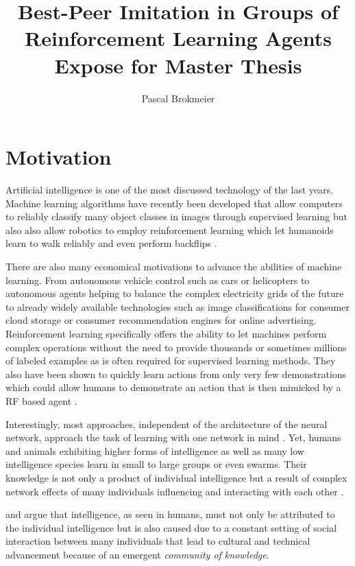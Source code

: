 \documentclass[12pt,a4paper]{article}
\title{Best-Peer Imitation in Groups of Reinforcement Learning Agents \\
\small{Expose for Master Thesis}}
\author{Pascal Brokmeier}
\begin{document}
\maketitle

\section{Motivation}

Artificial intelligence is one of the most discussed technology of the last years. Machine learning algorithms have recently been developed that allow computers to reliably classify many object classes in images \cite{krizhevsky2012imagenet} through supervised learning but also also allow robotics to employ reinforcement learning which let humanoids learn to walk reliably and even perform backflips \cite{proximalpolicyopt}.

There are also many economical motivations to advance the abilities of machine learning. From autonomous vehicle control such as cars or helicopters \cite{abbeel2010autonomous} to autonomous agents helping to balance the complex electricity grids of the future \cite{peters2013reinforcement} to already widely available technologies such as image classifications for consumer cloud storage or consumer recommendation engines for online advertising. Reinforcement learning specifically offers the ability to let machines perform complex operations without the need to provide thousands or sometimes millions of labeled examples as is often required for supervised learning methods. They also have been shown to quickly learn actions from only very few demonstrations which could allow humans to demonstrate an action that is then mimicked by a RF based agent \cite{duan2017one}.


Interestingly, most approaches, independent of the architecture of the neural network, approach the task of learning with one network in mind \cite[p.694ff]{russell2016artificial}. Yet, humans and animals exhibiting higher forms of intelligence as well as many low intelligence species learn in small to large groups or even swarms. Their knowledge is not only a product of individual intelligence but a result of complex network effects of many individuals influencing and interacting with each other \cite[p.200f]{sloman2017knowledge}.

\citeauthor{sloman2017knowledge} and \citeauthor{wegner1995computer} argue that intelligence, as seen in humans, must not only be attributed to the individual intelligence but is also caused due to a constant setting of social interaction between many individuals that lead to cultural and technical advancement because of an emergent \emph{community of knowledge}.
\end{document}
